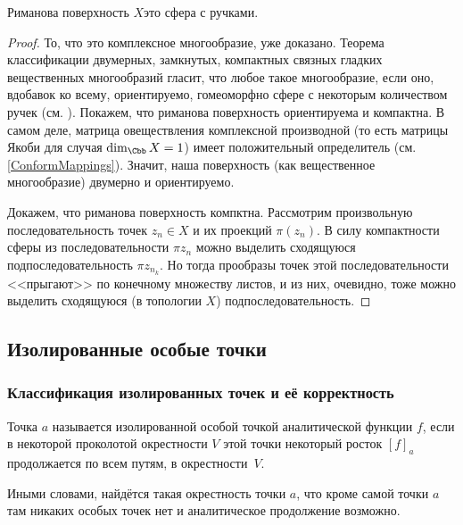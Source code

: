 \documentclass[a4paper]{article}
\begin{document}
\begin{imp}
Риманова поверхность $X$\т это сфера с ручками.
\end{imp}
\begin{proof}
То, что это комплексное многообразие, уже доказано. Теорема классификации двумерных, замкнутых, компактных
связных гладких вещественных многообразий гласит, что любое такое многообразие, если оно, вдобавок ко всему,
ориентируемо, гомеоморфно сфере с некоторым количеством ручек (см. \cite[гл.~4, \S~5, п.~3]{fomenko}). Покажем, что
риманова поверхность ориентируема и компактна. В самом деле, матрица овеществления комплексной производной (то
есть матрицы Якоби для случая $\dim_\Cbb X = 1$) имеет положительный определитель (см. \ref{ConformMappings}).
Значит, наша поверхность (как вещественное многообразие) двумерно и ориентируемо.

Докажем, что риманова поверхность компктна. Рассмотрим произвольную последовательность точек $z_n \in X$ и
их проекций $\pi(z_n)$. В силу компактности сферы из последовательности $\pi{z_n}$ можно выделить
сходящуюся подпоследовательность $\pi{z_{n_k}}$. Но тогда прообразы точек этой последовательности <<прыгают>> по
конечному множеству листов, и из них, очевидно, тоже можно выделить сходящуюся (в топологии $X$) подпоследовательность.
\end{proof}

\subsection{Изолированные особые точки}

\subsubsection{Классификация изолированных точек и её корректность}

\begin{df}
Точка $a$ называется изолированной особой точкой аналитической функции $f$, если в некоторой проколотой
окрестности $V$ этой точки некоторый росток $[f]_a$ продолжается по всем путям, в окрестности~$V$.
\end{df}

Иными словами, найдётся такая окрестность точки $a$, что кроме самой точки $a$ там никаких особых точек нет
и аналитическое продолжение возможно.
\end{document}

